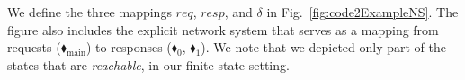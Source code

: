 
We define the three mappings $req$, $resp$, and $\delta$ in Fig.~\ref{fig:code2ExampleNS}.
The figure also includes the explicit network system that
serves as a mapping from requests ({\color{ForestGreen}$\blacklozenge_\text{main}$}) to responses ({\color{red}$\blacklozenge_0$}, {\color{red}$\blacklozenge_1$}).
%
We note that we depicted only part of the states that are \textit{reachable}, in our finite-state setting.
%







